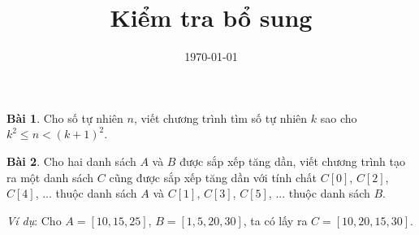\documentclass[12pt, a4paper]{article}
\title{Kiểm tra bổ sung}
\date{\today}
\author{}
\begin{document}
    \onehalfspacing
    \maketitle
    \textbf{Bài 1}. Cho số tự nhiên $n$, viết chương trình tìm số tự nhiên $k$ sao cho $k^2 \leq n < (k+1)^2$.

    \textbf{Bài 2}. Cho hai danh sách $A$ và $B$ được sắp xếp tăng dần,
    viết chương trình tạo ra một danh sách $C$ cũng được sắp xếp tăng dần với tính chất 
    $C[0]$, $C[2]$, $C[4]$, ... thuộc danh sách $A$ và $C[1]$, $C[3]$, $C[5]$, ... thuộc danh sách $B$.

    \textit{Ví dụ}: Cho $A = [10, 15, 25]$, $B = [1, 5, 20, 30]$, ta có lấy ra $C = [10, 20, 15, 30]$. 
\end{document}

